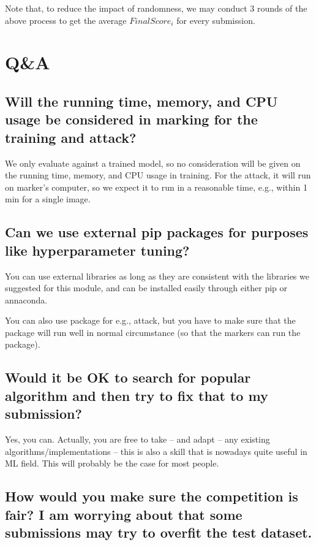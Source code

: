 Note that, to reduce the impact of randomness,
we may conduct 3 rounds of the above process to get the average $FinalScore_i$ for every submission. 


\section{Q\&A} 

\subsection*{Will the running time, memory, and CPU usage be considered in marking for the training and attack?}

We only evaluate against a trained model, so no consideration will be given on the running time, memory, and CPU usage in training. For the attack, it will run on marker's computer, so we expect it to run in a reasonable time, e.g., within 1 min for a single image. 

\subsection*{Can we use external pip packages for purposes like hyperparameter tuning? }

You can use external libraries as long as they are consistent with the libraries we suggested for this module, and can be installed easily through either pip or annaconda. 

You can also use package for e.g., attack, but you have to make sure that the package will run well in normal circumstance (so that the markers can run the package). 

\subsection*{Would it be OK to search for popular algorithm and then try to fix that to my submission?}

Yes, you can. Actually, you are free to take -- and adapt -- any existing algorithms/implementations – this is also a skill that is nowadays quite useful in ML field. This will probably be the case for most people.

\subsection*{How would you make sure the competition is fair? I am worrying about that some submissions may try to overfit the test dataset.}

